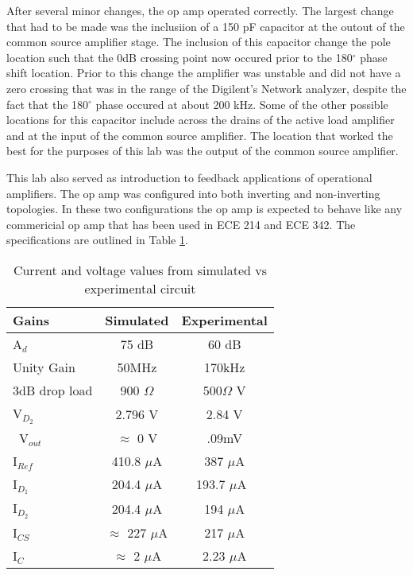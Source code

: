 
After several minor changes, the op amp operated correctly. The largest change that had to be made was the inclusiion of a 150 pF capacitor at the outout of the common source amplifier stage. The inclusion of this capacitor change the pole location such that the 0dB crossing point now occured prior to the 180$^\circ$ phase shift location. Prior to this change the amplifier was unstable and did not have a zero crossing that was in the range of the Digilent's Network analyzer, despite the fact that the 180$^\circ$ phase occured at about 200 kHz. Some of the other possible locations for this capacitor include across the drains of the active load amplifier and at the input of the common source amplifier. The location that worked the best for the purposes of this lab was the output of the common source amplifier.

 This lab also served as introduction to feedback applications of operational amplifiers. The op amp was configured into both inverting and non-inverting topologies. In these two configurations the op amp is expected to behave like any commericial op amp that has been used in ECE 214 and ECE 342. The specifications are outlined in Table \ref{tab:specs}.

\begin{table}[H]
	\centering
	\caption{Current and voltage values from simulated vs experimental circuit}
	\label{tab:specs}
	\begin{tabular}{|l|c|c|}                       
		\textbf{Gains} & Simulated & Experimental        \\ \hline
		A$_{d}$ & 75 dB      & 60 dB                                      \\ \hline
		Unity Gain &    50MHz      & 170kHz                    	   \\ \hline
		3dB drop load & 900 $\Omega$         & 500$\Omega$ V                              	       	       \\ \hline
		V$_{D_2}$  & 2.796 V                       & 2.84 V                        	   \\ \hline\
		V$_{out}$ & $\approx$ 0 V				& .09mV 						 \\ \hline
		I$_{Ref}$ & 410.8 $\mu$A            & 387 $\mu$A                                       \\ \hline
		I$_{D_1}$ & 204.4 $\mu$A              &  193.7 $\mu$A\                                    \\ \hline
		I$_{D_2}$ & 204.4 $\mu$A                  & 194 $\mu$A                                \\ \hline
		I$_{CS}$  & $\approx$  227 $\mu$A               & 217 $\mu$A                            \\ \hline
		I$_{C}$   & $\approx$ 2  $\mu$A				& 2.23 $\mu$A 						 \\	\hline

	\end{tabular}
\end{table}



